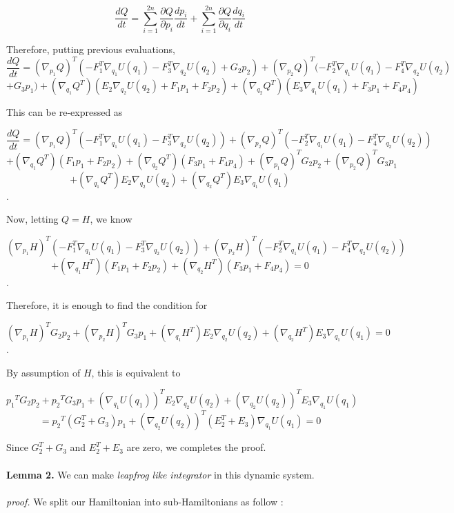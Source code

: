 \documentclass{article}
\begin{document}
$$\displaystyle\frac{dQ}{dt} = \sum_{i=1}^{2n} \frac{\partial Q} {\partial p_i} \frac{dp_i}{dt}+  \sum_{i=1}^{2n} \frac{\partial Q} {\partial q_i} \frac{dq_i}{dt}$$

\noindent Therefore, putting previous evaluations, 
$$\displaystyle\frac{dQ}{dt}
 = (\nabla_{p_1}Q)^T (-F_1^T \nabla_{q_1} U(q_1) - F_3^T \nabla_{q_2} U(q_2)  + G_2 p_2) 
+  (\nabla_{p_2}Q)^T(-F_2^T \nabla_{q_1} U(q_1) - F_4^T \nabla_{q_2} U(q_2) $$ $$ + G_3 p_1) 
+ (\nabla_{q_1}Q^T)(E_2 \nabla_{q_2} U(q_2) + F_1 p_1 + F_2 p_2) + (\nabla_{q_2}Q^T)(E_3 \nabla_{q_1} U(q_1) + F_3 p_1 + F_4 p_4)$$

This can be re-expressed as

$$\displaystyle\frac{dQ}{dt} = {(\nabla_{p_1}Q)^T}(-F_1^T \nabla_{q_1} U(q_1) - F_3^T\nabla_{q_2} U(q_2) ) +  
(\nabla_{p_2}Q)^T(-F_2^T \nabla_{q_1} U(q_1) - F_4^T \nabla_{q_2} U(q_2)) $$
$$+(\nabla_{q_1}Q^T)( F_1 p_1 + F_2 p_2) +
(\nabla_{q_2}Q^T)(F_3 p_1 + F_4 p_4) +
(\nabla_{p_1}Q)^TG_2 p_2+ 
(\nabla_{p_2}Q)^TG_3 p_1$$
$$+(\nabla_{q_1}Q^T)E_2 \nabla_{q_2} U(q_2) +(\nabla_{q_2}Q^T)E_3 \nabla_{q_1} U(q_1)$$.

Now, letting $Q=H$, we know 

$${(\nabla_{p_1}H)^T}(-F_1^T \nabla_{q_1} U(q_1) - F_3^T\nabla_{q_2} U(q_2) ) +  (\nabla_{p_2}H)^T(-F_2^T \nabla_{q_1} U(q_1) - F_4^T \nabla_{q_2} U(q_2)) $$
$$+  
(\nabla_{q_1}H^T)( F_1 p_1 + F_2 p_2) +
(\nabla_{q_2}H^T)(F_3 p_1 + F_4 p_4)=0$$.

Therefore, it is enough to find the condition for 

$$(\nabla_{p_1}H)^TG_2 p_2+ 
(\nabla_{p_2}H)^TG_3 p_1+
(\nabla_{q_1}H^T)E_2 \nabla_{q_2} U(q_2) +
(\nabla_{q_2}H^T)E_3 \nabla_{q_1} U(q_1) = 0$$.

By assumption of $H$, this is equivalent to 

$${p_1}^TG_2 p_2+ 
{p_2}^TG_3 p_1+
(\nabla_{q_1}U(q_1))^TE_2 \nabla_{q_2} U(q_2) +
(\nabla_{q_2}U(q_2))^TE_3 \nabla_{q_1} U(q_1) $$
$$={p_2}^T(G_2^T + G_3) p_1 + (\nabla_{q_2}U(q_2))^T(E_2^T + E_3) \nabla_{q_1} U(q_1) = 0$$

Since $G_2^T + G_3$ and $E_2^T + E_3 $ are zero, we completes the proof. 
\\
\\
\noindent \textbf{Lemma 2.}  We can make \textit{leapfrog like integrator} in this dynamic system.
\\
\\
\textit{proof.} We split our Hamiltonian into sub-Hamiltonians as follow :
\end{document}
